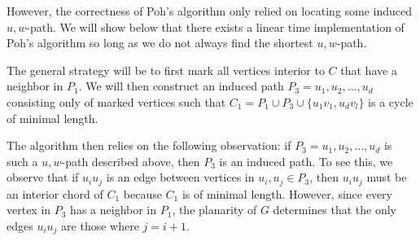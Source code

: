\documentclass[12pt,letterpaper]{article}
\theoremstyle{plain}
\theoremstyle{definition}
\theoremstyle{break}
\begin{document}
However, the correctness of Poh's algorithm only relied on
locating some induced $u,w$-path.
We will show below that there exists a linear time implementation of Poh's
algorithm so long as we do not always find the shortest $u,w$-path.

The general strategy will be to first mark all vertices
interior to $C$ that have a neighbor in $P_1$. We will then construct an
induced path $P_3=u_1,u_2,\ldots,u_d$ consisting only of marked vertices
such that $C_1=P_1\cup P_3\cup\{u_1v_1,u_dv_l\}$ is a cycle of minimal length.

The algorithm then relies on the following observation: if $P_3=u_1,u_2,\ldots,u_d$
is such a $u,w$-path described above, then $P_3$ is an induced path. To see
this, we observe that
if $u_iu_j$ is an edge between vertices in $u_i,u_j\in P_3$, then $u_iu_j$ must be an
interior chord of $C_1$ because $C_1$ is of minimal length. However, since
every vertex in $P_3$ has a neighbor in $P_1$, the planarity of $G$ determines
that the only edges $u_iu_j$ are those where $j=i+1$.
\end{document}
